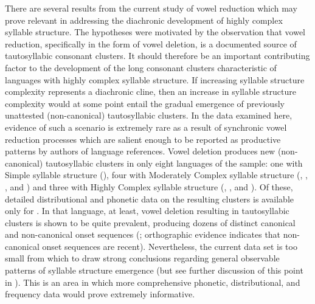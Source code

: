   There are several results from the current study of vowel reduction which may prove relevant in addressing the diachronic development of highly complex syllable structure. The hypotheses were motivated by the observation that vowel reduction, specifically in the form of vowel deletion, is a documented source of tautosyllabic consonant clusters. It should therefore be an important contributing factor to the development of the long consonant clusters characteristic of languages with highly complex syllable structure. If increasing syllable structure complexity represents a diachronic cline, then an increase in syllable structure complexity would at some point entail the gradual emergence of previously unattested (non-canonical) tautosyllabic clusters. In the data examined here, evidence of such a scenario is extremely rare as a result of synchronic vowel reduction processes which are salient enough to be reported as productive patterns by authors of language references. Vowel deletion produces new (non-canonical) tautosyllabic clusters in only eight languages of the sample: one with Simple syllable structure (), four with Moderately Complex syllable structure (, , , and ) and three with Highly Complex syllable structure (, , and ). Of these, detailed distributional and phonetic data on the resulting clusters is available only for . In that language, at least, vowel deletion resulting in tautosyllabic clusters is shown to be quite prevalent, producing dozens of distinct canonical and non-canonical onset sequences (\citealt{Klippenstein2010}; orthographic evidence indicates that non-canonical onset sequences are recent). Nevertheless, the current data set is too small from which to draw strong conclusions regarding general observable patterns of syllable structure emergence (but see further discussion of this point in ). This is an area in which more comprehensive phonetic, distributional, and frequency data would prove extremely informative.

